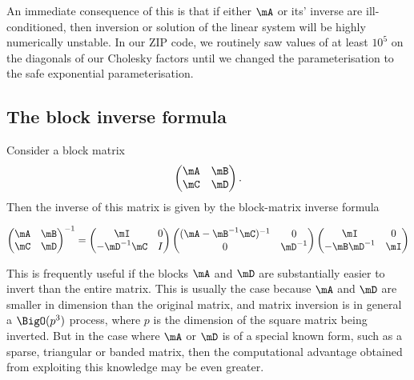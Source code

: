 An immediate consequence of this is that if either $\mA$ or its' inverse are ill-conditioned, then inversion
or solution of the linear system will be highly numerically unstable. In our ZIP code, we routinely saw values of 
at least $10^5$ on the diagonals of our Cholesky factors until we changed the parameterisation to the safe
exponential parameterisation.

\subsection{The block inverse formula}

Consider a block matrix
\[
	\begin{pmatrix}
		\mA & \mB \\
		\mC & \mD 
	\end{pmatrix}.
\]
Then the inverse of this matrix is given by the block-matrix inverse formula

\[
	\begin{pmatrix}
		\mA & \mB \\
		\mC & \mD 
	\end{pmatrix}^{-1}
	=
	\begin{pmatrix}
		\mI           & 0 \\
		-\mD^{-1} \mC & I 
	\end{pmatrix}
	\begin{pmatrix}
		(\mA - \mB^{-1}\mC)^{-1} & 0        \\
		0                        & \mD^{-1} 
	\end{pmatrix}
	\begin{pmatrix}
		\mI          & 0   \\
		-\mB\mD^{-1} & \mI 
	\end{pmatrix}
\]

This is frequently useful if the blocks $\mA$ and $\mD$ are substantially easier to invert than the entire
matrix. This is usually the case because $\mA$ and $\mD$ are smaller in dimension than the original matrix,
and matrix inversion is in general a $\BigO(p^3)$ process, where $p$ is the dimension of the square matrix
being inverted. But in the case where $\mA$ or $\mD$ is of a special known form, such as a sparse, triangular
or banded matrix, then the computational advantage obtained from exploiting this knowledge may be even
greater.

